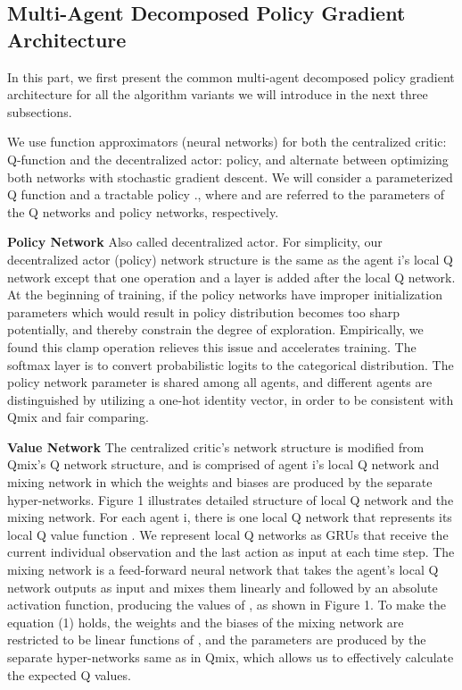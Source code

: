 \documentclass[runningheads]{llncs}
\begin{document}
\subsection{Multi-Agent Decomposed Policy Gradient Architecture}
In this part, 
we first present the common multi-agent decomposed policy gradient architecture for all the algorithm variants we will introduce in the next three subsections.


We use function approximators (neural networks) for both the centralized critic: Q-function and the decentralized actor: policy, and alternate between optimizing both networks with stochastic gradient descent. We will consider a parameterized Q function  and a tractable policy ., where  and  are referred to the parameters of the Q networks and policy networks, respectively.

{\bf Policy Network} Also called decentralized actor. For simplicity,
our decentralized actor (policy) network structure is the same as the agent i's local Q network except that one  operation and a  layer is added after the local Q network. At the beginning of training, if the policy networks have improper initialization parameters which would result in policy distribution becomes too sharp potentially, and thereby constrain the degree of exploration. Empirically, we found this clamp operation relieves this issue and accelerates training. The softmax layer is to convert probabilistic logits to the categorical distribution. 
The policy network parameter is shared among all agents, and different agents are distinguished by utilizing a one-hot identity vector, in order to be consistent with Qmix and fair comparing. 


{\bf Value Network} The centralized critic's network structure is modified from Qmix's Q network structure, and is comprised of agent i's local Q network  and mixing network  in which the weights and biases are produced by the separate hyper-networks. Figure 1 illustrates detailed structure of local Q network and the mixing network. 
For each agent i, there is one local Q network that represents its local Q value function . We represent local Q networks as GRUs \cite{b17} that receive the current individual
observation  and the last action  as input at each time step.
The mixing network is a feed-forward neural network that
takes the agent's local Q network outputs as input and mixes them
linearly and followed by an absolute activation function, producing the values of , as shown in Figure 1. To make the equation (1) holds,
the weights and the biases of the mixing network are restricted
to be linear functions of , and the parameters are produced by the separate
hyper-networks same as in Qmix,
which allows us to effectively calculate the expected Q values.
\end{document}
